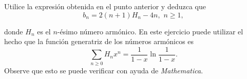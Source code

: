 Utilice la expresión obtenida en el punto anterior y deduzca que
            \begin{equation}
                b_n=2(n+1)H_n-4n,\,\,n\geq1,
            \end{equation}
            
            donde $H_n$ es el $n$-ésimo número armónico. En este ejercicio puede utilizar el hecho que la función generatriz de los números armónicos es
            \begin{equation}
                \sum_{n\geq0}H_nx^n=\frac{1}{1-x}\ln \frac{1}{1-x}.
            \end{equation}
            Observe que esto se puede verificar con ayuda de \textit{Mathematica}\textsuperscript{\textregistered}.